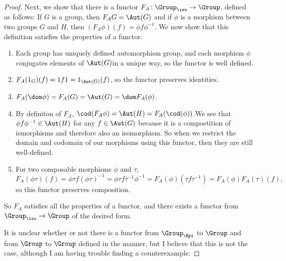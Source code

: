 \documentclass[main.tex]{subfiles}
\begin{document}
\begin{proof}
Next, we show that there is a functor $F_A\colon \Group_{\iso} \rightarrow \Group$, defined as follows: If $G$ is a group, then $F_AG = \Aut(G)$ and if $\phi$ is a morphism between two groups $G$ and $H$, then $(F_A\phi)(f) = \phi f \phi^{-1}$. We now show that this definition satisfies the properties of a functor. 
\begin{enumerate}
    \item Each group has uniquely defined automorphism group, and each morphism $\phi$ conjugates elements of $\Aut(G)$in a unique way, so the functor is well defined. 
    \item $F_A(1_G)(f) = 1f1 = 1_{\Aut(G)}(f)$, so the functor preserves identities. 
    \item $F_A(\dom \phi) = F_A(G) = \Aut(G) = \dom F_A(\phi)$.
    \item By definiton of $F_A$, $\cod(F_A\phi) = \Aut(H) = F_A(\cod(\phi))$.We see that $\phi f \phi^{-1} \in \Aut(H)$ for any $f \in \Aut(G)$ because it is a compostition of ismorphisms and therefore also an isomorphism. So when we restrict the domain and codomain of our morphisms using this functor, then they are still well-defined. 
    \item For two composable morphisms $\phi$ and $\tau$, \[F_A(\phi\tau)(f) = \phi\tau f (\phi\tau)^{-1} = \phi \tau f \tau^{-1} \phi^{-1} = F_A(\phi)(\tau f \tau^{-1}) = F_A(\phi)F_A(\tau)(f),\] so this functor preserves composition.
    
\end{enumerate}
So $F_A$ satisfies all the properties of a functor, and there exists a functor from $\Group_{\iso} \rightarrow \Group$ of the desired form. 

It is unclear whether or not there is a functor from  $\Group_{\Epi}$ to $\Group$ and from $\Group$ to $\Group$ defined in the manner, but I believe that this is not the case, although I am having trouble finding a counterexample. 
\end{proof}
\end{document}
